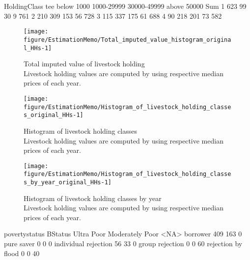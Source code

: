 \begin{Schunk}
\begin{Soutput}
   HoldingClass
tee below 1000 1000-29999 30000-49999 above 50000 Sum
  1        623         99          30           9 761
  2        210        309         153          56 728
  3        115        337         175          61 688
  4         90        218         201          73 582
\end{Soutput}
\end{Schunk}
\begin{Schunk}
\begin{figure}

{\centering \texttt{[image: figure/EstimationMemo/Total\_imputed\_value\_histogram\_original\_HHs-1]} 

}

\caption{Total imputed value of livestock holding\\ {\footnotesize Livestock holding values are computed by using respective median prices of each year.\setlength{\baselineskip}{8pt}}}\label{Figure Total imputed value histogram original HHs}
\end{figure}
\end{Schunk}
\begin{Schunk}
\begin{figure}

{\centering \texttt{[image: figure/EstimationMemo/Histogram\_of\_livestock\_holding\_classes\_original\_HHs-1]} 

}

\caption{Histogram of livestock holding classes\\ {\footnotesize Livestock holding values are computed by using respective median prices of each year.\setlength{\baselineskip}{8pt}}}\label{Figure Histogram of livestock holding classes original HHs}
\end{figure}
\end{Schunk}
\begin{Schunk}
\begin{figure}

{\centering \texttt{[image: figure/EstimationMemo/Histogram\_of\_livestock\_holding\_classes\_by\_year\_original\_HHs-1]} 

}

\caption{Histogram of livestock holding classes by year\\ {\footnotesize Livestock holding values are computed by using respective median prices of each year.\setlength{\baselineskip}{8pt}}}\label{Figure Histogram of livestock holding classes by year original HHs}
\end{figure}
\end{Schunk}
\begin{Schunk}
\begin{Soutput}
                      povertystatus
BStatus                Ultra Poor Moderately Poor <NA>
  borrower                    409             163    0
  pure saver                    0               0    0
  individual rejection         56              33    0
  group rejection               0               0   60
  rejection by flood            0               0   40
\end{Soutput}
\end{Schunk}


